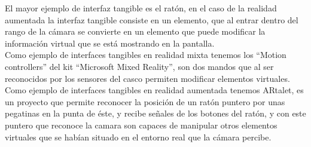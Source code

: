 El mayor ejemplo de interfaz tangible es el ratón, en el caso de la realidad aumentada la interfaz tangible consiste en un elemento, que al entrar dentro del rango de la cámara se convierte en un elemento que puede modificar la información virtual que se está mostrando en la pantalla.\\

Como ejemplo de interfaces tangibles en realidad mixta tenemos los “Motion controllers” del kit “Microsoft Mixed Reality”, son dos mandos que al ser reconocidos por los sensores del casco permiten modificar elementos virtuales. \cite{windows-mixed-reality}\\

Como ejemplo de interfaces tangibles en realidad aumentada tenemos ARtalet, es un proyecto que permite reconocer la posición de un ratón puntero por unas pegatinas en la punta de éste, y recibe señales de los botones del ratón, y con este puntero que reconoce la camara son capaces de manipular otros elementos virtuales que se habían situado en el entorno real que la cámara percibe. \cite{ha}\\
